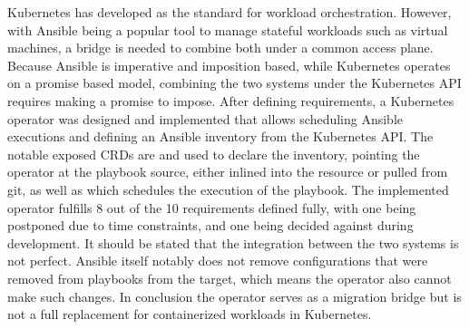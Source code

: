 Kubernetes has developed as the standard for workload orchestration.
However, with Ansible being a popular tool to manage stateful workloads such as virtual machines, a bridge is needed to combine both under a common access plane.
Because Ansible is imperative and imposition based, while Kubernetes operates on a promise based model, combining the two systems under the Kubernetes API requires making a promise to impose.
After defining requirements, a Kubernetes operator was designed and implemented that allows scheduling Ansible executions and defining an Ansible inventory from the Kubernetes API.
The notable exposed CRDs are \anhost and \angroup used to declare the inventory, \anplaybook pointing the operator at the playbook source, either inlined into the resource or pulled from git, as well as \anrecjob which schedules the execution of the playbook.
The implemented operator fulfills 8 out of the 10 requirements defined fully, with one being postponed due to time constraints, and one being decided against during development.
It should be stated that the integration between the two systems is not perfect. Ansible itself notably does not remove configurations that were removed from playbooks from the target, which means the operator also cannot make such changes.
In conclusion the operator serves as a migration bridge but is not a full replacement for containerized workloads in Kubernetes.
